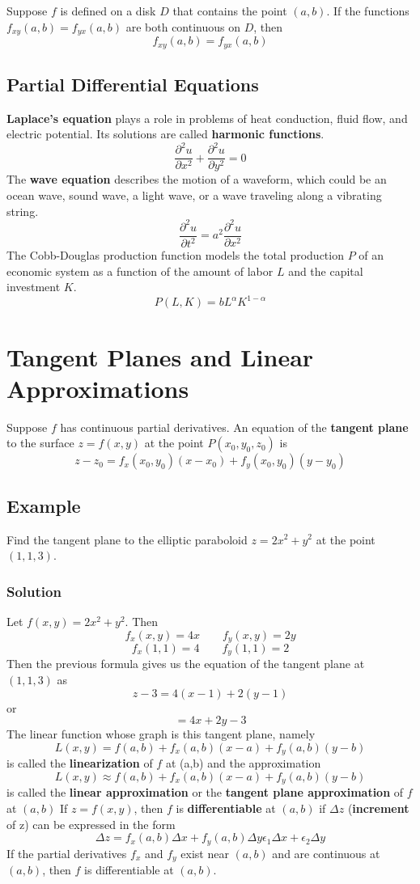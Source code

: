 Suppose $f$ is defined on a disk $D$ that contains the point $(a,b)$. If the functions $f_{xy}(a,b) = f_{yx}(a,b)$ are both continuous on $D$, then
$$f_{xy}(a,b) = f_{yx}(a,b)$$
\subsection*{Partial Differential Equations}
\textbf{Laplace's equation} plays a role in problems of heat conduction, fluid flow, and electric potential. Its solutions are called \textbf{harmonic functions}.
$$\frac{\partial^2u}{\partial x^2} + \frac{\partial^2u}{\partial y^2} = 0$$
The \textbf{wave equation} describes the motion of a waveform, which could be an ocean wave, sound wave, a light wave, or a wave traveling along a vibrating string.
$$\frac{\partial^2u}{\partial t^2} = a^2\frac{\partial^2u}{\partial x^2}$$
The Cobb-Douglas production function models the total production $P$ of an economic system as a function of the amount of labor $L$ and the capital investment $K$.
$$P(L,K) = bL^{\alpha} K^{1-\alpha}$$

\section{Tangent Planes and Linear Approximations}
Suppose $f$ has continuous partial derivatives. An equation of the \textbf{tangent plane} to the surface $z = f(x,y)$ at the point $P(x_0, y_0, z_0)$ is 
$$z - z_0 = f_x(x_0, y_0)(x - x_0) + f_y(x_0, y_0)(y-y_0)$$
\subsection*{Example}
Find the tangent plane to the elliptic paraboloid $z = 2x^2 + y^2$ at the point $(1,1,3)$.
\subsubsection*{Solution} Let $f(x,y) = 2x^2 + y^2$. Then $$f_x(x,y) = 4x\qquad f_y(x,y) = 2y$$ $$f_x(1,1) = 4\qquad f_y(1,1) = 2$$
Then the previous formula gives us the equation of the tangent plane at $(1,1,3)$ as 
$$z - 3 = 4(x-1) + 2(y-1)$$ or $$ = 4x + 2y - 3$$
The linear function whose graph is this tangent plane, namely $$L(x,y) = f(a,b) + f_x(a,b)(x-a) + f_y(a,b)(y-b)$$ is called the 
\textbf{linearization} of $f$ at (a,b) and the approximation $$L(x,y)\approx f(a,b) + f_x(a,b)(x-a) + f_y(a,b)(y-b)$$
is called the \textbf{linear approximation} or the \textbf{tangent plane approximation} of $f$ at $(a,b)$
If $z = f(x,y)$, then $f$ is \textbf{differentiable} at $(a,b)$ if $\Delta z$ (\textbf{increment} of z) can be expressed in the form 
$$\Delta z = f_x(a,b)\Delta x + f_y(a,b)\Delta y\epsilon_1\Delta x + \epsilon_2\Delta y$$
If the partial derivatives $f_x$ and $f_y$ exist near $(a,b)$ and are continuous at $(a,b)$, then $f$ is differentiable at $(a,b)$.
